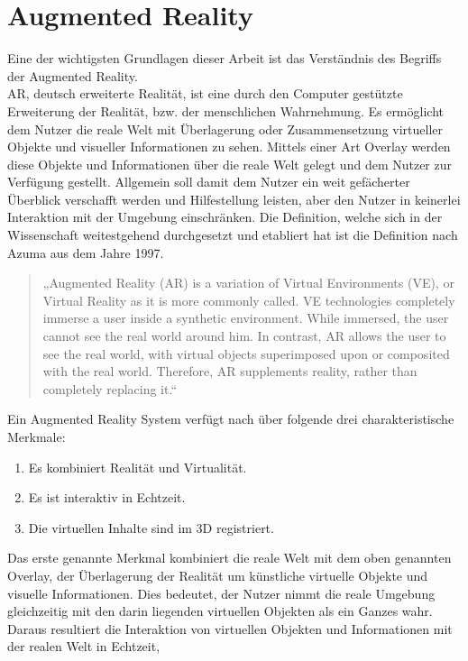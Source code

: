 \section{Augmented Reality}
\label{chap:Augmented Reality}
Eine der wichtigsten Grundlagen dieser Arbeit ist das Verständnis des Begriffs der Augmented Reality.
\\ 
\acl{AR}, deutsch erweiterte Realität, ist eine durch den Computer gestützte Erweiterung der Realität, bzw. der menschlichen 
Wahrnehmung. Es ermöglicht dem Nutzer die reale Welt mit Überlagerung oder Zusammensetzung virtueller Objekte und visueller Informationen
zu sehen. Mittels einer Art Overlay werden diese Objekte und Informationen über die reale Welt gelegt und dem Nutzer zur Verfügung gestellt. 
Allgemein soll damit dem Nutzer ein weit gefächerter Überblick verschafft werden und Hilfestellung leisten, aber den Nutzer in keinerlei 
Interaktion mit der Umgebung einschränken. Die Definition, welche sich in der Wissenschaft weitestgehend durchgesetzt und etabliert hat ist 
die Definition nach Azuma aus dem Jahre 1997.
\begin{quote}
    „Augmented Reality (AR) is a variation of Virtual Environments (VE), or Virtual Reality as it is more commonly called. VE 
    technologies completely immerse a user inside a synthetic environment. While immersed, the user cannot see the real world around him. 
    In contrast, AR allows the user to see the real world, with virtual objects superimposed upon or composited with the real world. 
    Therefore, AR supplements reality, rather than completely replacing it.“ \cite{azuma.1997a}
\end{quote}
Ein Augmented Reality System verfügt nach \cite{azuma.1997a} über folgende drei charakteristische Merkmale: 
\begin{enumerate}
    \item Es kombiniert Realität und Virtualität.
    \item Es ist interaktiv in Echtzeit.
    \item Die virtuellen Inhalte sind im 3D registriert.
\end{enumerate}
Das erste genannte Merkmal kombiniert die reale Welt mit dem oben genannten Overlay, der Überlagerung der Realität um künstliche virtuelle 
Objekte und visuelle Informationen. Dies bedeutet, der Nutzer nimmt die reale Umgebung gleichzeitig mit den darin liegenden virtuellen 
Objekten als ein Ganzes wahr. Daraus resultiert die Interaktion von virtuellen Objekten und Informationen mit der realen Welt in Echtzeit, 
